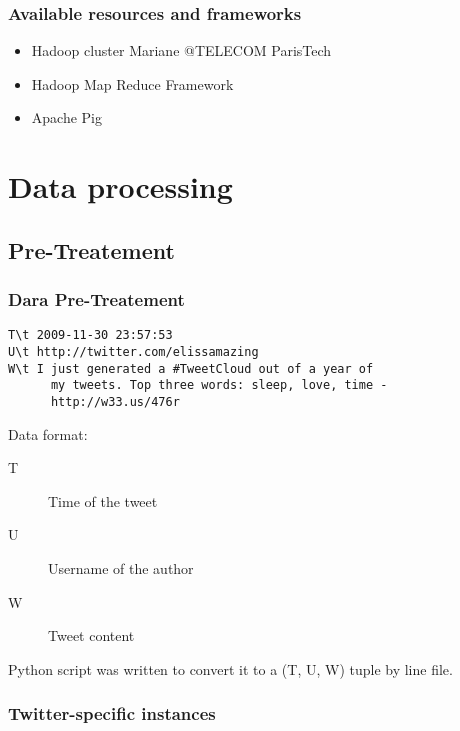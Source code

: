\documentclass[handout]{beamer}
\begin{document}
\begin{frame}
\frametitle{\bf Available resources and frameworks}

\begin{itemize}
\item Hadoop cluster Mariane @TELECOM ParisTech
\item Hadoop Map Reduce Framework
\item Apache Pig
\end{itemize}

\end{frame}


\section{Data processing}

\subsection{Pre-Treatement}


\begin{frame}[fragile]
\frametitle{\bf Dara Pre-Treatement}

\begin{verbatim}
T\t 2009-11-30 23:57:53
U\t http://twitter.com/elissamazing
W\t I just generated a #TweetCloud out of a year of
      my tweets. Top three words: sleep, love, time -
      http://w33.us/476r
\end{verbatim}

Data format:
\begin{description}
\item[T] Time of the tweet
\item[U] Username of the author
\item[W] Tweet content
\end{description}
    
Python script was written to convert it to a (T, U, W) tuple by line file.

\end{frame}


\subsubsection{Twitter-specific instances}
\end{document}
